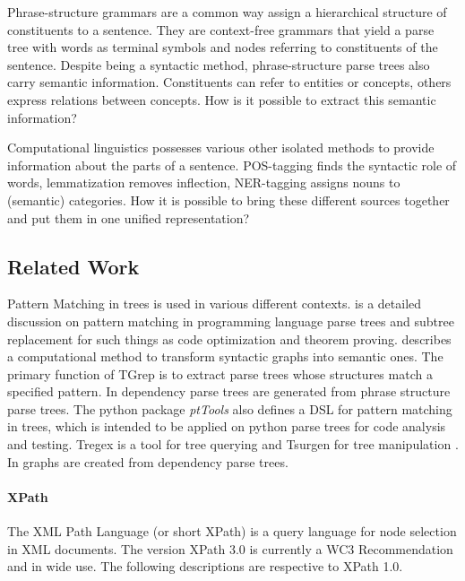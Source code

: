 \documentclass[english]{article}
\begin{document}
Phrase-structure grammars are a common way assign a hierarchical structure of constituents to a sentence. They are context-free grammars that yield a parse tree with words as terminal symbols and nodes referring to constituents of the sentence. Despite being a syntactic method, phrase-structure parse trees also carry semantic information. Constituents can refer to entities or concepts, others express relations between concepts. How is it possible to extract this semantic information?

Computational linguistics possesses various other isolated methods to provide information about the parts of a sentence. POS-tagging finds the syntactic role of words, lemmatization removes inflection, NER-tagging assigns nouns to (semantic) categories. How it is possible to bring these different sources together and put them in one unified representation?


\subsection{Related Work}

Pattern Matching in trees is used in various different contexts. \cite{hoffmann_pattern_1982} is a detailed discussion on pattern matching in programming language parse trees and subtree replacement for such things as code optimization and theorem proving. \cite{rim_transforming_1990} describes a computational method to transform syntactic graphs into semantic ones. The primary function of TGrep \cite{rohde_tgrep2_2004} is to extract parse trees whose structures match a specified pattern. In \cite{de_marneffe_generating_2006} dependency parse trees are generated from phrase structure parse trees.
The python package \textit{ptTools} also defines a DSL for pattern matching in trees, which is intended to be applied on python parse trees for code analysis and testing. Tregex is a tool for tree querying and Tsurgen for tree manipulation \cite{levy_tregex_2006}. In \cite{ribeyre_linguistically-motivated_2012} graphs are created from dependency parse trees.

\paragraph{XPath}
The XML Path Language (or short XPath) is a query language for node selection in XML documents. The version XPath 3.0 is currently a WC3 Recommendation and in wide use. The following descriptions are respective to XPath 1.0.
\end{document}
